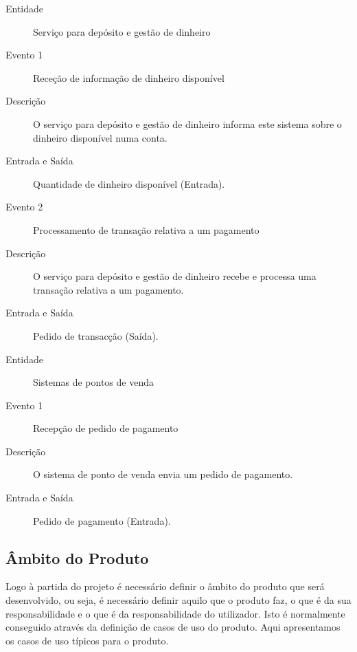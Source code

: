 \documentclass{article}
\begin{document}
      \begin{description}
        \item[Entidade]Serviço para depósito e gestão de dinheiro
        \item[Evento 1]Receção de informação de dinheiro disponível
        \item[Descrição]O serviço para depósito e gestão de dinheiro informa este sistema sobre o dinheiro disponível numa conta.
        \item[Entrada e Saída]Quantidade de dinheiro disponível (Entrada).

        \item[Evento 2]Processamento de transação relativa a um pagamento
        \item[Descrição]O serviço para depósito e gestão de dinheiro recebe e processa uma transação relativa a um pagamento.
        \item[Entrada e Saída]Pedido de transacção (Saída).
      \end{description}  
      \vspace{0.5cm}

      \begin{description}
        \item[Entidade]Sistemas de pontos de venda

        \item[Evento 1]Recepção de pedido de pagamento
        \item[Descrição]O sistema de ponto de venda envia um pedido de pagamento.
        \item[Entrada e Saída]Pedido de pagamento (Entrada).
      \end{description}

  \subsection{Âmbito do Produto}

    Logo à partida do projeto é necessário definir o âmbito do produto que será desenvolvido, ou seja, é necessário definir aquilo que o produto faz, o que é da sua responsabilidade e o que é da responsabilidade do utilizador. Isto é normalmente conseguido através da definição de casos de uso do produto. Aqui apresentamos os casos de uso típicos para o produto.
\end{document}
